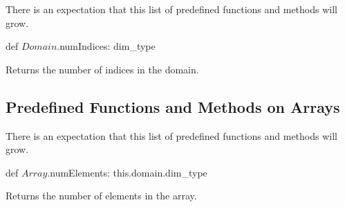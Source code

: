 There is an expectation that this list of predefined functions and
methods will grow.

\begin{protohead}
def $Domain$.numIndices: dim_type
\end{protohead}
\begin{protobody}
Returns the number of indices in the domain.
\end{protobody}

\subsection{Predefined Functions and Methods on Arrays}

There is an expectation that this list of predefined functions and
methods will grow.

\begin{protohead}
def $Array$.numElements: this.domain.dim_type
\end{protohead}
\begin{protobody}
Returns the number of elements in the array.
\end{protobody}

